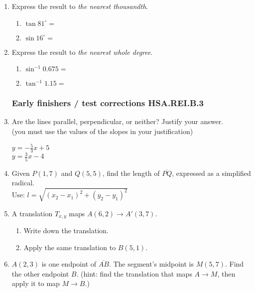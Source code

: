 \documentclass[12pt, twoside]{article}
\begin{document}
\begin{enumerate}
\item Express the result to \emph{the nearest thousandth}.
\begin{multicols}{2}
  \begin{enumerate}
    \item $\tan 81^\circ =$
    \item $\sin 16^\circ =$
  \end{enumerate}
\end{multicols} \vspace{1cm}

\item Express the result to \emph{the nearest whole degree}.
\begin{multicols}{2}
  \begin{enumerate}
    \item $\sin^{-1} 0.675 =$
    \item $\tan^{-1} 1.15 =$
  \end{enumerate}
\end{multicols}

\newpage
\subsubsection*{Early finishers / test corrections \hfill HSA.REI.B.3}
\item Are the lines parallel, perpendicular, or neither? Justify your answer. \\(you must use the values of the slopes in your justification)
  \begin{multicols}{2}
    $y = -\frac{5}{3}x+5$ \\
    $y = \frac{3}{5}x-4$
  \end{multicols} \vspace{3cm}

\item Given $P(1,7)$ and $Q(5,5)$, find the length of $\overline{PQ}$, expressed as a simplified radical.\\[0.25cm]
Use: $l=\sqrt{(x_2-x_1)^2+(y_2-y_1)^2}$
    \vspace{4cm}

\item A translation $T_{x,y}$ maps $A(6,2) \rightarrow A'(3,7)$. 
\begin{enumerate}
  \item Write down the translation. \vspace{1cm}
  \item Apply the same translation to $B(5, 1)$.
\end{enumerate} \vspace{2cm}

\item $A(2,3)$ is one endpoint of $\overline{AB}$. The segment's midpoint is $M(5,7)$. Find the other endpoint $B$. (hint: find the translation that maps $A \rightarrow M$, then apply it to map $M \rightarrow B$.)

\end{enumerate}
\end{document}
